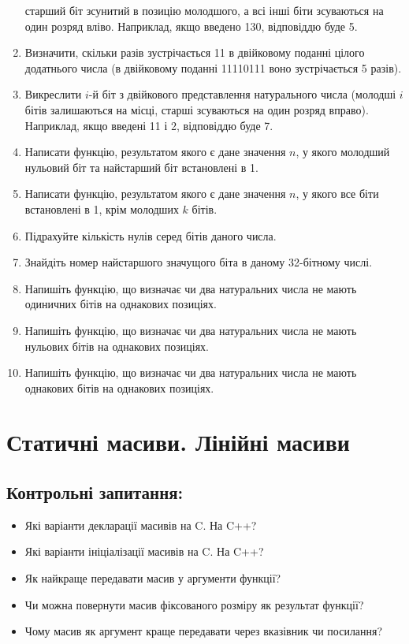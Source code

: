 \documentclass[a5paper,titlepage,openany,twoside,draft]{book_unv}%
\begin{document}
\begin{enumerate}
  старший біт зсунитий в позицію молодшого, а всі інші біти зсуваються
  на один розряд вліво. Наприклад, якщо введено 130, відповіддю буде 5.
\item
  Визначити, скільки разів зустрічається 11 в двійковому поданні цілого
  додатнього числа (в двійковому поданні 11110111 воно зустрічається 5
  разів).
\item
  Викреслити $i$-й біт з двійкового представлення натурального числа
  (молодші $i$ бітів залишаються на місці, старші зсуваються на один
  розряд вправо). Наприклад, якщо введені 11 і 2, відповіддю буде 7.
\item
  Написати функцію, результатом якого є дане значення $n$, у якого 
молодший нульовий біт та найстарший біт встановлені в 1.
\item
  Написати функцію, результатом якого є дане значення $n$, у якого все
  біти встановлені в 1, крім молодших $k$ бітів.
\item
  Підрахуйте кількість нулів серед бітів даного числа.
\item
  Знайдіть номер найстаршого значущого біта в даному 32-бітному числі.
\item
  Напишіть функцію, що визначає чи два натуральних числа не мають
  одиничних бітів на однакових позиціях.
\item
  Напишіть функцію, що визначає чи два натуральних числа не мають
  нульових бітів на однакових позиціях.
\item
  Напишіть функцію, що визначає чи два натуральних числа не мають
  однакових бітів на однакових позиціях.
\end{enumerate}


\chapter{ Статичні масиви. Лінійні масиви }
%

\section{Контрольні запитання:}
\begin{itemize}
\item
  Які варіанти декларації масивів на C. На C++?
\item
  Які варіанти ініціалізації масивів на C. На C++?
\item
  Як найкраще передавати масив у аргументи функції?
\item
  Чи можна повернути масив фіксованого розміру як результат функції?
\item
  Чому масив як аргумент краще передавати через вказівник чи посилання?

\end{itemize}
\end{document}
